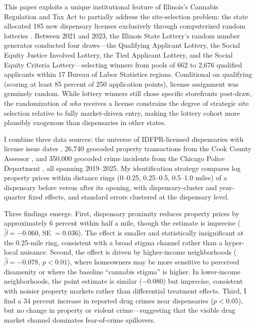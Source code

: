 \documentclass[12pt]{article}
\begin{document}
This paper exploits a unique institutional feature of Illinois's Cannabis Regulation and Tax Act to partially address the site-selection problem: the state allocated 185 new dispensary licenses exclusively through computerized random lotteries \citep{illinois_crta2019}. Between 2021 and 2023, the Illinois State Lottery's random number generator conducted four draws---the Qualifying Applicant Lottery, the Social Equity Justice Involved Lottery, the Tied Applicant Lottery, and the Social Equity Criteria Lottery---selecting winners from pools of 662 to 2,676 qualified applicants within 17 Bureau of Labor Statistics regions. Conditional on qualifying (scoring at least 85 percent of 250 application points), license assignment was genuinely random. While lottery winners still chose specific storefronts post-draw, the randomization of \textit{who} receives a license constrains the degree of strategic site selection relative to fully market-driven entry, making the lottery cohort more plausibly exogenous than dispensaries in other states.

I combine three data sources: the universe of IDFPR-licensed dispensaries with license issue dates \citep{idfpr2024}, 26,740 geocoded property transactions from the Cook County Assessor \citep{cookcounty2026}, and 350,000 geocoded crime incidents from the Chicago Police Department \citep{chicagopd2026}, all spanning 2019--2025. My identification strategy compares log property prices within distance rings (0--0.25, 0.25--0.5, 0.5--1.0 miles) of a dispensary before versus after its opening, with dispensary-cluster and year-quarter fixed effects, and standard errors clustered at the dispensary level.

Three findings emerge. First, dispensary proximity reduces property prices by approximately 6 percent within half a mile, though the estimate is imprecise ($\hat{\beta} = -0.060$, SE $= 0.036$). The effect is smaller and statistically insignificant at the 0.25-mile ring, consistent with a broad stigma channel rather than a hyper-local nuisance. Second, the effect is driven by higher-income neighborhoods ($\hat{\beta} = -0.078$, $p < 0.01$), where homeowners may be more sensitive to perceived disamenity or where the baseline ``cannabis stigma'' is higher. In lower-income neighborhoods, the point estimate is similar ($-0.080$) but imprecise, consistent with noisier property markets rather than differential treatment effects. Third, I find a 34 percent increase in reported drug crimes near dispensaries ($p < 0.05$), but no change in property or violent crime---suggesting that the visible drug market channel dominates fear-of-crime spillovers.
\end{document}
